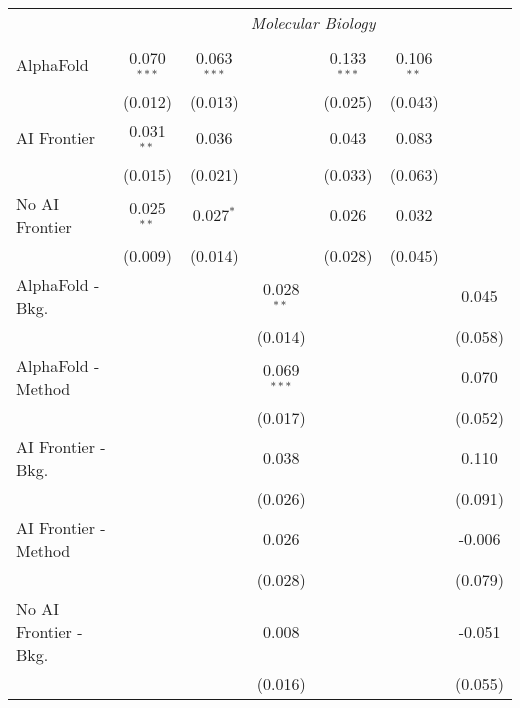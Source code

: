 \begin{tabular}{lcccccc}
 & \multicolumn{6}{c}{\textit{Molecular Biology}} \\ \\
   AlphaFold               & 0.070$^{***}$ & 0.063$^{***}$ &               & 0.133$^{***}$ & 0.106$^{**}$ &   \\   
                           & (0.012)       & (0.013)       &               & (0.025)       & (0.043)      &   \\   
   AI Frontier             & 0.031$^{**}$  & 0.036         &               & 0.043         & 0.083        &   \\   
                           & (0.015)       & (0.021)       &               & (0.033)       & (0.063)      &   \\   
   No AI Frontier          & 0.025$^{**}$  & 0.027$^{*}$   &               & 0.026         & 0.032        &   \\   
                           & (0.009)       & (0.014)       &               & (0.028)       & (0.045)      &   \\   
   AlphaFold - Bkg.        &               &               & 0.028$^{**}$  &               &              & 0.045\\   
                           &               &               & (0.014)       &               &              & (0.058)\\   
   AlphaFold - Method      &               &               & 0.069$^{***}$ &               &              & 0.070\\   
                           &               &               & (0.017)       &               &              & (0.052)\\   
   AI Frontier - Bkg.      &               &               & 0.038         &               &              & 0.110\\   
                           &               &               & (0.026)       &               &              & (0.091)\\   
   AI Frontier - Method    &               &               & 0.026         &               &              & -0.006\\   
                           &               &               & (0.028)       &               &              & (0.079)\\   
   No AI Frontier - Bkg.   &               &               & 0.008         &               &              & -0.051\\   
                           &               &               & (0.016)       &               &              & (0.055)\\   

\end{tabular}
